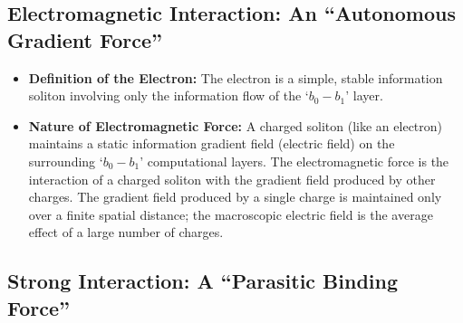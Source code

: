 \documentclass[11pt, a4paper]{article}
\begin{document}
\subsection{Electromagnetic Interaction: An ``Autonomous Gradient Force''}

\begin{itemize}
    \item \textbf{Definition of the Electron:} The electron is a simple, stable information soliton involving only the information flow of the `$b_0-b_1$' layer.
    \item \textbf{Nature of Electromagnetic Force:} A charged soliton (like an electron) maintains a static information gradient field (electric field) on the surrounding `$b_0-b_1$' computational layers. The electromagnetic force is the interaction of a charged soliton with the gradient field produced by other charges. The gradient field produced by a single charge is maintained only over a finite spatial distance; the macroscopic electric field is the average effect of a large number of charges.
\end{itemize}

\subsection{Strong Interaction: A ``Parasitic Binding Force''}
\end{document}
